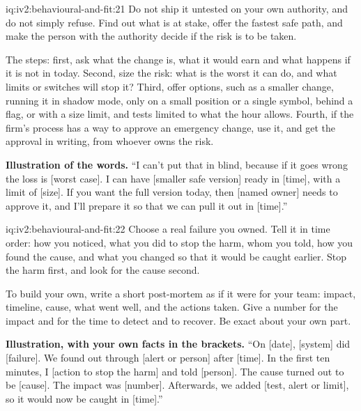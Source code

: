 \begin{solution}{iq:iv2:behavioural-and-fit:21}
Do not ship it untested on your own authority, and do not simply refuse. Find out what is at stake, offer the fastest safe path, and make the person with the authority decide if the risk is to be taken.

The steps: first, ask what the change is, what it would earn and what happens if it is not in today. Second, size the risk: what is the worst it can do, and what limits or switches will stop it? Third, offer options, such as a smaller change, running it in shadow mode, only on a small position or a single symbol, behind a flag, or with a size limit, and tests limited to what the hour allows. Fourth, if the firm's process has a way to approve an emergency change, use it, and get the approval in writing, from whoever owns the risk.

\textbf{Illustration of the words.} ``I can't put that in blind, because if it goes wrong the loss is [worst case]. I can have [smaller safe version] ready in [time], with a limit of [size]. If you want the full version today, then [named owner] needs to approve it, and I'll prepare it so that we can pull it out in [time].''

\end{solution}

\begin{solution}{iq:iv2:behavioural-and-fit:22}
Choose a real failure you owned. Tell it in time order: how you noticed, what you did to stop the harm, whom you told, how you found the cause, and what you changed so that it would be caught earlier. Stop the harm first, and look for the cause second.

To build your own, write a short post-mortem as if it were for your team: impact, timeline, cause, what went well, and the actions taken. Give a number for the impact and for the time to detect and to recover. Be exact about your own part.

\textbf{Illustration, with your own facts in the brackets.} ``On [date], [system] did [failure]. We found out through [alert or person] after [time]. In the first ten minutes, I [action to stop the harm] and told [person]. The cause turned out to be [cause]. The impact was [number]. Afterwards, we added [test, alert or limit], so it would now be caught in [time].''

\end{solution}

